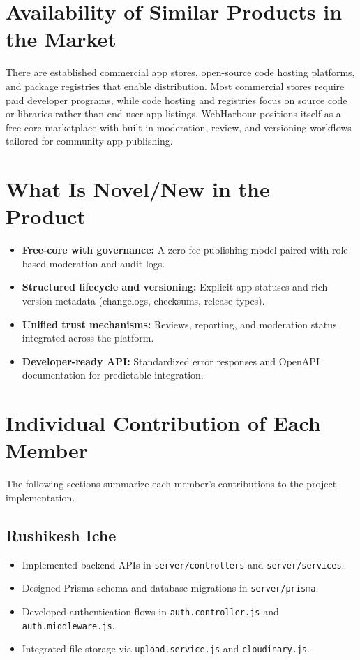 \documentclass[12pt,a4paper]{article}
\begin{document}
\section{Availability of Similar Products in the Market}
There are established commercial app stores, open-source code hosting platforms, and package registries that enable distribution. Most commercial stores require paid developer programs, while code hosting and registries focus on source code or libraries rather than end-user app listings. WebHarbour positions itself as a free-core marketplace with built-in moderation, review, and versioning workflows tailored for community app publishing.

\section{What Is Novel/New in the Product}
\begin{itemize}
    \item \textbf{Free-core with governance:} A zero-fee publishing model paired with role-based moderation and audit logs.
    \item \textbf{Structured lifecycle and versioning:} Explicit app statuses and rich version metadata (changelogs, checksums, release types).
    \item \textbf{Unified trust mechanisms:} Reviews, reporting, and moderation status integrated across the platform.
    \item \textbf{Developer-ready API:} Standardized error responses and OpenAPI documentation for predictable integration.
\end{itemize}

\section{Individual Contribution of Each Member}
The following sections summarize each member's contributions to the project implementation.
\subsection{Rushikesh Iche}
\begin{itemize}
    \item Implemented backend APIs in \texttt{server/controllers} and \texttt{server/services}.
    \item Designed Prisma schema and database migrations in \texttt{server/prisma}.
    \item Developed authentication flows in \texttt{auth.controller.js} and \texttt{auth.middleware.js}.
    \item Integrated file storage via \texttt{upload.service.js} and \texttt{cloudinary.js}.
\end{itemize}
\end{document}
